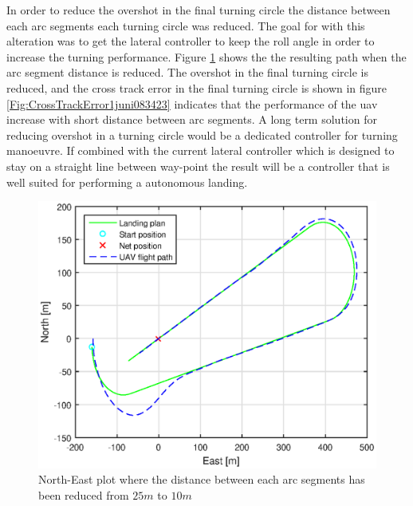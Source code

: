 In order to reduce the overshot in the final turning circle the distance between each arc segments each turning circle was reduced. The goal for with this alteration was to get the lateral controller to keep the roll angle in order to increase the turning performance. Figure \ref{Fig:NorthEast1juni083423} shows the the resulting path when the arc segment distance is reduced. The overshot in the final turning circle is reduced, and the cross track error in the final turning circle is shown in figure \ref{Fig:CrossTrackError1juni083423} indicates that the performance of the \gls{uav} increase with short distance between arc segments. A long term solution for reducing overshot in a turning circle would be a dedicated controller for turning manoeuvre. If combined with the current lateral controller which is designed to stay on a straight line between way-point the result will be a controller that is well suited for performing a autonomous landing.
\begin{figure}[H]
\centering
\includegraphics[scale=0.7]{figs/Experiment/NorthEast1juni083423.eps}
\caption{North-East plot where the distance between each arc segments has been reduced from $25 m$ to $10 m$}
\label{Fig:NorthEast1juni083423}
\end{figure}
